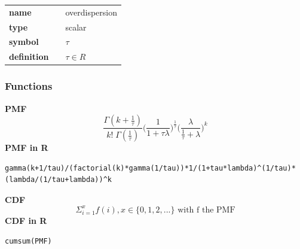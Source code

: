 \noindent\begin{tabular}{p{2cm}cl}
\textbf{name} & & overdispersion \\
\textbf{type} & & scalar \\
\textbf{symbol} & & $\tau$  \\
\textbf{definition} & & $\tau \in R$
\end{tabular}
\subsubsection*{Functions}

\smallskip \noindent \hspace{.2cm} \textbf{PMF} 
\begin{equation*}\frac{\Gamma(k + \frac{1}{\tau})}{k!\; \Gamma(\frac{1}{\tau})} \Big(\frac{1}{1+\tau \lambda} \Big)^{\frac{1}{\tau}} 
\Big(\frac{\lambda}{\frac{1}{\tau} + \lambda} \Big)^{k}\end{equation*}
\smallskip \noindent \hspace{.2cm} \textbf{PMF in R}  
\begin{verbatim}
gamma(k+1/tau)/(factorial(k)*gamma(1/tau))*1/(1+tau*lambda)^(1/tau)*(lambda/(1/tau+lambda))^k
\end{verbatim}
\smallskip \noindent \hspace{.2cm} \textbf{CDF} 
\begin{equation*}\Sigma_{i=1}^x f(i), x \in \{0,1,2,...\}
\text { with f the PMF}\end{equation*}
\smallskip \noindent \hspace{.2cm} \textbf{CDF in R}  
\begin{verbatim}
cumsum(PMF)
\end{verbatim}
\smallskip
